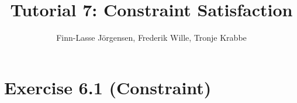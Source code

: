 \documentclass[12pt,a4paper]{article}
\author{Finn-Lasse Jörgensen, Frederik Wille, Tronje Krabbe}
\title{Tutorial 7: Constraint Satisfaction}
\begin{document}
\maketitle


\section*{Exercise 6.1 (Constraint)}
\end{document}
